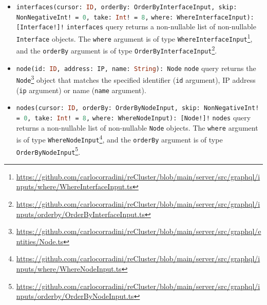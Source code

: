 \begin{itemize}
  \item \lstinline[language=graphql, morekeywords={[2]{Interface, OrderByInterfaceInput, NonNegativeInt, WhereInterfaceInput}},
    morekeywords={[4]{cursor, orderBy, skip, take, where}}, morekeywords={[5]{interfaces}}]{interfaces(cursor: ID, orderBy: OrderByInterfaceInput, skip: NonNegativeInt! = 0, take: Int! = 8,}
    \hphantom{----------------}\lstinline[language=graphql, morekeywords={[2]{Interface, OrderByInterfaceInput, NonNegativeInt, WhereInterfaceInput}},
    morekeywords={[4]{cursor, orderBy, skip, take, where}}, morekeywords={[5]{interfaces}}]{where: WhereInterfaceInput): [Interface!]!}
    \newline
    \texttt{interfaces} query returns a non-nullable list of non-nullable \texttt{Interface}
    objects.
    \newline
    The \texttt{where} argument is of type \texttt{WhereInterfaceInput}\footnote{\url{https://github.com/carlocorradini/reCluster/blob/main/server/src/graphql/inputs/where/WhereInterfaceInput.ts}},
    and the \texttt{orderBy} argument is of type \texttt{OrderByInterfaceInput}\footnote{\url{https://github.com/carlocorradini/reCluster/blob/main/server/src/graphql/inputs/orderby/OrderByInterfaceInput.ts}}.

  \item \lstinline[language=graphql, morekeywords={[2]{Node, IP}}, morekeywords={[4]{address, id, name}},
    morekeywords={[5]{node}}]{node(id: ID, address: IP, name: String): Node}
    \newline
    \texttt{node} query returns the \texttt{Node}\footnote{\url{https://github.com/carlocorradini/reCluster/blob/main/server/src/graphql/entities/Node.ts}}
    object that matches the specified identifier (\texttt{id} argument), IP
    address (\texttt{ip} argument) or name (\texttt{name} argument).

  \item \lstinline[language=graphql, morekeywords={[2]{Node, OrderByNodeInput, NonNegativeInt, WhereNodeInput}},
    morekeywords={[4]{cursor, orderBy, skip, take, where}}, morekeywords={[5]{nodes}}]{nodes(cursor: ID, orderBy: OrderByNodeInput, skip: NonNegativeInt! = 0, take: Int! = 8,}
    \newline
    \hphantom{-----------}\lstinline[language=graphql, morekeywords={[2]{Node, OrderByNodeInput, NonNegativeInt, WhereNodeInput}},
    morekeywords={[4]{cursor, orderBy, skip, take, where}}, morekeywords={[5]{nodes}}]{where: WhereNodeInput): [Node!]!}
    \newline
    \texttt{nodes} query returns a non-nullable list of non-nullable \texttt{Node}
    objects.
    \newline
    The \texttt{where} argument is of type \texttt{WhereNodeInput}\footnote{\url{https://github.com/carlocorradini/reCluster/blob/main/server/src/graphql/inputs/where/WhereNodeInput.ts}},
    and the \texttt{orderBy} argument is of type \texttt{OrderByNodeInput}\footnote{\url{https://github.com/carlocorradini/reCluster/blob/main/server/src/graphql/inputs/orderby/OrderByNodeInput.ts}}.


\end{itemize}
